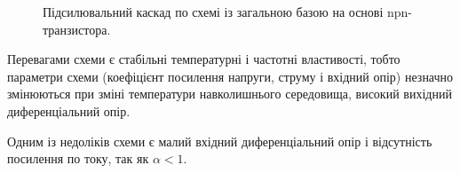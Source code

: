 \documentclass[a4paper,14pt]{extreport}
\begin{document}
\begin{figure}[h]
  \caption{Підсилювальний каскад по схемі із загальною базою на основі npn-транзистора.}
  \label{ris1}
\end{figure}

Перевагами схеми є стабільні температурні і частотні властивості, тобто параметри схеми (коефіцієнт посилення напруги, струму і вхідний опір) незначно змінюються при зміні температури навколишнього середовища, високий вихідний диференціальний опір.

Одним із недоліків схеми є малий вхідний диференціальний опір і відсутність посилення по току, так як $\alpha < 1$.\\

\noindent{\color{Mycolor1} \rule{\linewidth}{1mm} }
\end{document}
